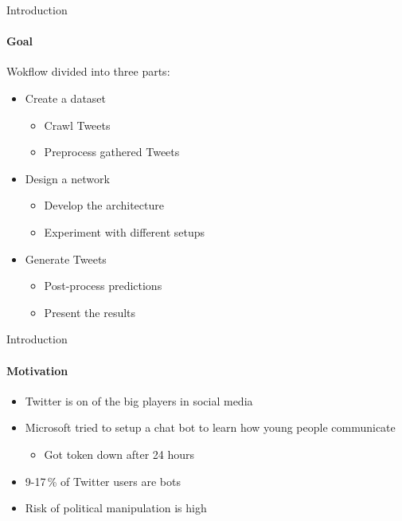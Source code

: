 \documentclass{beamer}
\begin{document}
\begin{frame}{Introduction}
\framesubtitle{Goal}
Wokflow divided into three parts:
\vspace{5mm}
\begin{itemize}
\item Create a dataset
	\begin{itemize}
	\item Crawl Tweets
	\item Preprocess gathered Tweets
	\end{itemize}
\vspace{3mm}
\item<2-> Design a network
	\begin{itemize}
	\item Develop the architecture
	\item Experiment with different setups
	\end{itemize}
\vspace{3mm}
\item<3-> Generate Tweets
	\begin{itemize}
	\item Post-process predictions
	\item Present the results
	\end{itemize}
\end{itemize}
\end{frame}

\begin{frame}{Introduction}
\framesubtitle{Motivation}
\begin{itemize}
\item Twitter is on of the big players in social media
\item Microsoft tried to setup a chat bot to learn how young people communicate
	\begin{itemize}
	\item Got token down after 24 hours
	\end{itemize}
\item 9-17\,\% of Twitter users are bots
\item Risk of political manipulation is high
\end{itemize}
\end{frame}
\end{document}
